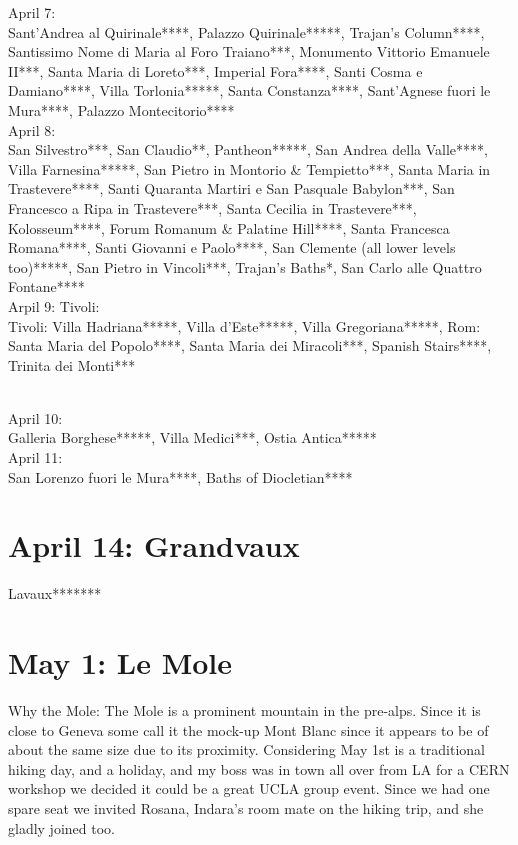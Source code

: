 April 7:\\
Sant'Andrea al Quirinale****, Palazzo Quirinale*****, Trajan's Column****, Santissimo Nome di Maria al Foro Traiano***, Monumento Vittorio Emanuele II***, Santa Maria di Loreto***, Imperial Fora****, Santi Cosma e Damiano****, Villa Torlonia*****,  Santa Constanza****, Sant'Agnese fuori le Mura****, Palazzo Montecitorio****\\

April 8:\\
San Silvestro***, San Claudio**, Pantheon*****, San Andrea della Valle****, Villa Farnesina*****, San Pietro in Montorio \& Tempietto***, Santa Maria in Trastevere****, Santi Quaranta Martiri e San Pasquale Babylon***, San Francesco a Ripa in Trastevere***, Santa Cecilia in Trastevere***, Kolosseum****, Forum Romanum \& Palatine Hill****, Santa Francesca Romana****, Santi Giovanni e Paolo****, San Clemente (all lower levels too)*****, San Pietro in Vincoli***, Trajan's Baths*, San Carlo alle Quattro Fontane****\\

Arpil 9: Tivoli:\\
Tivoli: Villa Hadriana*****, Villa d'Este*****, Villa Gregoriana*****, Rom: Santa Maria del Popolo****, Santa Maria dei Miracoli***, Spanish Stairs****, Trinita dei Monti***\\\

April 10:\\
Galleria Borghese*****, Villa Medici***, Ostia Antica*****\\

April 11:\\
San Lorenzo fuori le Mura****, Baths of Diocletian****

\section{April 14: Grandvaux}
\label{Lavaux2013}

Lavaux*******

\section{May 1: Le Mole}
\label{Mole2013}

Why the Mole: The Mole is a prominent mountain in the pre-alps. Since it is close to Geneva some call it the mock-up Mont Blanc since it appears to be of about the same size due to its proximity. Considering May 1st is a traditional hiking day, and a holiday, and my boss was in town all over from LA for a CERN workshop we decided it could be a great UCLA group event. Since we had one spare seat we invited Rosana, Indara's room mate on the hiking trip, and she gladly joined too.\\

